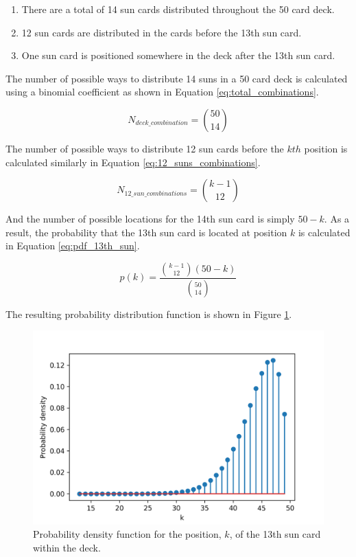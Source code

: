 \documentclass{article}
\begin{document}
\begin{enumerate}
    \item There are a total of 14 sun cards distributed throughout the 50 card deck.
    \item 12 sun cards are distributed in the cards before the 13th sun card.
    \item One sun card is positioned somewhere in the deck after the 13th sun card.
\end{enumerate}

The number of possible ways to distribute 14 suns in a 50 card deck is calculated using a binomial coefficient as shown in Equation \ref{eq:total_combinations}.

\begin{equation} \label{eq:total_combinations}
  N_{deck\_combination} = \binom{50}{14}
\end{equation}

The number of possible ways to distribute 12 sun cards before the $kth$ position is calculated similarly in Equation \ref{eq:12_suns_combinations}.

\begin{equation} \label{eq:12_suns_combinations}
  N_{12\_sun\_combinations} = \binom{k-1}{12}
\end{equation}

And the number of possible locations for the 14th sun card is simply $50-k$.  As a result, the probability that the 13th sun card is located at position $k$ is calculated in Equation \ref{eq:pdf_13th_sun}.

\begin{equation} \label{eq:pdf_13th_sun}
  p(k) = \frac{\binom{k-1}{12} \left( 50-k \right)}{\binom{50}{14}}
\end{equation}



The resulting probability distribution function is shown in Figure \ref{fig:13th_sun_pdf}.

\begin{figure}
  \includegraphics[width=\linewidth]{pdf_13th_sun_position.png}
  \caption{Probability density function for the position, $k$, of the 13th sun card within the deck.}
  \label{fig:13th_sun_pdf}
\end{figure}
\end{document}

